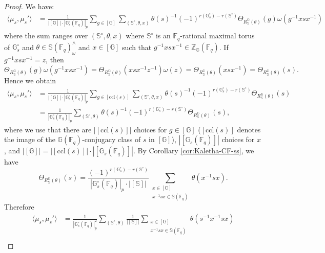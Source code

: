 \documentclass{amsart}
\newcommand{\ccl}{\mathrm{ccl}}
\newcommand{\F}{\mathbb{F}}
\newcommand{\FF}{\mathbb{F}}
\newcommand{\bbS}{\mathbb{S}}
\newcommand{\bbG}{\mathbb{G}}
\newcommand{\bbZ}{\mathbb{Z}}
\theoremstyle{plain}
\theoremstyle{definition}
\theoremstyle{remark}
\theoremstyle{theorem}
\begin{document}
\begin{proof}
    We have:
    \begin{align*}
        \langle \mu_s, \mu_s' \rangle 
        &= \frac{1}{|[\bbG]| \cdot |\bbG_s^\circ(\FF_q)|_p} \sum_{g \in [\bbG]} \sum_{(\bbS^\circ,\theta,x)} \theta(s)^{-1} (-1)^{r(\bbG_s^\circ) - r(\bbS^\circ)} \Theta_{R_{\bbS}^{\bbG}(\theta)}(g) \omega(g^{-1} xsx^{-1})
    \end{align*}
    where the sum ranges over $(\bbS^\circ,\theta,x)$ where $\bbS^\circ$ is an $\F_{q}$-rational maximal torus of  $\bbG_{s}^\circ$ and $\theta \in \bbS(\FF_q)^\wedge_\omega$ and $x \in [\bbG]$ such that $g^{-1} xsx^{-1} \in \bbZ_{\bbG}(\FF_q)$. If $g^{-1} xsx^{-1} = z$, then 
    \begin{equation*}
        \Theta_{R_{\bbS}^{\bbG}(\theta)}(g) \omega(g^{-1} xsx^{-1}) = \Theta_{R_{\bbS}^{\bbG}(\theta)}(xsx^{-1} z^{-1}) \omega(z) = \Theta_{R_{\bbS}^{\bbG}(\theta)}(xsx^{-1}) = \Theta_{R_{\bbS}^{\bbG}(\theta)}(s).
    \end{equation*}
    Hence we obtain
    \begin{align*}
        \langle \mu_s, \mu_s' \rangle 
        &= \frac{1}{|[\bbG]| \cdot |\bbG_s^\circ(\FF_q)|_p} \sum_{g \in [\ccl(s)]} \sum_{(\bbS^\circ, \theta,x)} \theta(s)^{-1} (-1)^{r(\bbG_s^\circ) - r(\bbS^\circ)} \Theta_{R_{\bbS}^{\bbG}(\theta)}(s) \\
        &= \frac{1}{|\bbG_s^\circ(\FF_q)|_p} \sum_{(\bbS^\circ, \theta)} \theta(s)^{-1} (-1)^{r(\bbG_s^\circ) - r(\bbS^\circ)} \Theta_{R_{\bbS}^{\bbG}(\theta)}(s),
    \end{align*}
    where we use that there are $|[\ccl(s)]|$ choices for $g\in[\bbG]$ ($[\ccl(s)]$ denotes the image of the $\bbG(\F_{q})$-conjugacy class of $s$ in $[\bbG]$), $|[\bbG_s(\FF_q)]|$ choices for $x$, and $|[\bbG]| = |[\ccl(s)]| \cdot |[\bbG_s(\FF_q)]|$. By Corollary \ref{cor:Kaletha-CF-ss}, we have 
    \begin{equation*}
        \Theta_{R_{\bbS}^{\bbG}(\theta)}(s) = \frac{(-1)^{r(\bbG_s^\circ) - r(\bbS^\circ)}}{|\bbG_s^\circ(\FF_q)|_p \cdot |[\bbS]|} \sum_{\substack{x \in [\bbG] \\ x^{-1}sx \in \bbS(\FF_q)}} \theta(x^{-1} s x).
    \end{equation*}
    Therefore
    \begin{align}
    	\nonumber
        \langle \mu_s, \mu_s' \rangle 
        &= \frac{1}{|\bbG_s^\circ(\FF_q)|_p^2} \sum_{(\bbS^\circ, \theta)} \frac{1}{|[\bbS]|} \sum_{\substack{x \in [\bbG] \\ x^{-1} s x \in \bbS(\FF_q)}} \theta(s^{-1}x^{-1} s x) \\

\end{align}
\end{proof}
\end{document}
